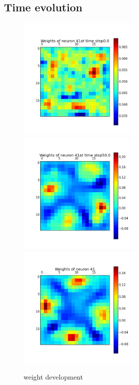 \documentclass[a4paper, 12pt]{article}
\begin{document}
\subsection{Time evolution}
\begin{figure}[htbp]
\begin{minipage}[hbt]{0,49\textwidth}
        \centering
\includegraphics[width=6cm,height=6cm]{neurons/neuron_w_41_t_0.png}\\[10pt]
\includegraphics[width=6cm,height=6cm]{neurons/neuron_w_41_t_50.png} \\[10pt]
\includegraphics[width=6cm,height=6cm]{neurons/neuron_w_41.png}
        \caption{weight development}
        \label{LabelA}
\end{minipage}
\begin{minipage}[hbt]{0,49\textwidth}

\end{minipage}
\end{figure}
\end{document}
